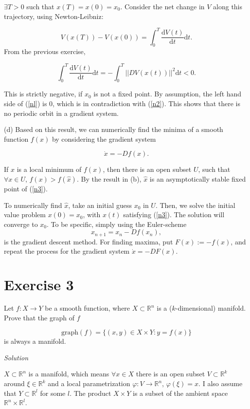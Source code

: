 \documentclass[a4paper,11pt,pdftex]{article}
\begin{document}
$\exists T>0$ such that $x(T)=x(0)=x_0$. Consider the net change in $V$ along this trajectory, using Newton-Leibniz:

\begin{equation}
\label{nl}
    V(x(T)) - V(x(0)) = \int_0^T \frac{\text{d}V(t)}{\text{d}t} \text{d}t.
\end{equation}
From the previous exercise, 

\begin{equation}
    \label{n2}
    \int_0^T \frac{\text{d}V(t)}{\text{d}t} \text{d}t = -\int_0^T ||DV(x(t))||^2 \text{d}t < 0.
\end{equation}

This is strictly negative, if $x_0$ is not a fixed point. By assumption, the left hand side of (\ref{nl}) is 0, which is in contradiction with (\ref{n2}). This shows that there is no periodic orbit in a gradient system.

(d) Based on this result, we can numerically find the minima of a smooth function $f(x)$ by considering the gradient system

\begin{equation}
\label{n3}
\dot{x} = - Df(x).
\end{equation}{}


If $\hat{x}$ is a local minimum of $f(x)$, then there is an open subset $U$, such that 
$\forall x\in U$, $f(x)>f(\hat{x})$. By the result in (b), $\hat{x}$ is an asymptotically stable fixed point of (\ref{n3}). 

To numerically find $\hat{x}$, take an initial guess $x_0$ in $U$. Then, we solve the initial value problem $x(0)=x_0$, with $x(t)$ satisfying (\ref{n3}). The solution will converge to $x_0$. To be specific, simply using the Euler-scheme
$$
x_{n+1} = x_{n} - Df(x_{n}),
$$
is the gradient descent method. For finding maxima, put $F(x):=-f(x)$, and repeat the process for the gradient system $\dot{x} = -DF(x)$.

\section*{Exercise 3}
Let $f : X \to Y$ be a smooth function, where $X\subset \mathbb{R}^n$ is a ($k$-dimensional) manifold. Prove that the graph of $f$

$$
\text{graph}(f) = \{(x,y)\in X\times Y : y = f(x)\}
$$
is always a manifold. 

\emph{Solution}

$X\subset \mathbb{R}^n$ is a manifold, which means $\forall x\in X$ there is an open subset $V\subset \mathbb{R}^k$ around $\xi\in \mathbb{R}^k$ and a local parametrization $\varphi : V \to \mathbb{R}^n$, $\varphi(\xi) = x$. I also assume that $Y\subset \mathbb{R}^l$ for some $l$. The product $X\times Y$ is a subset of the ambient space $\mathbb{R}^n\times \mathbb{R}^l$.
\end{document}
